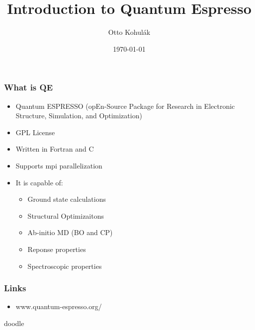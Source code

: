 \documentclass{beamer}
\begin{document}
\title{Introduction to Quantum Espresso}   
\author{Otto Kohul\'{a}k} 
\date{\today} 

\frame{\titlepage} 

\begin{frame}
  \frametitle{What is QE}
  \begin{itemize}
    \item Quantum ESPRESSO (opEn-Source Package for Research in Electronic Structure, Simulation, and Optimization)
    \item GPL License
    \item Written in Fortran and C
    \item Supports mpi parallelization
    \item It is capable of:
    \begin{itemize}
      \item Ground state calculations
      \item Structural Optimizaitons
      \item Ab-initio MD (BO and CP)
      \item Reponse properties
      \item Spectroscopic properties
    \end{itemize}
  \end{itemize}
\end{frame}

\begin{frame}
  \frametitle{Links}
  \begin{itemize}
    \item www.quantum-espresso.org/
  \end{itemize}
\end{frame}

\begin{frame}
doodle
\end{frame}
\end{document}
